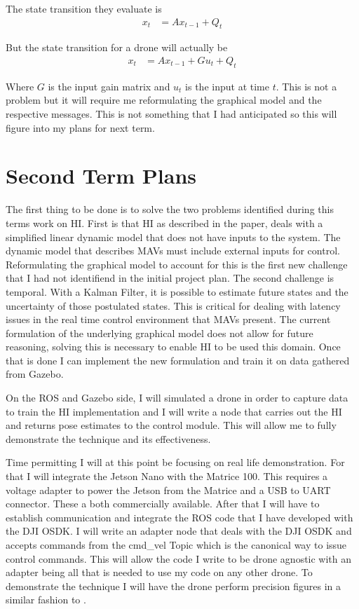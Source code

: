 \documentclass[]{../resources/final_report}
\begin{document}
The state transition they evaluate is 
\begin{align}
  x_t &= Ax_{t-1} + Q_t
\end{align}

But the state transition for a drone will actually be
\begin{align}
  x_t &= Ax_{t-1} + Gu_t + Q_t
\end{align} 

Where $G$ is the input gain matrix and $u_t$ is the input at time $t$.
This is not a problem but it will require me reformulating the graphical model and the respective 
messages. This is not something that I had anticipated so this will figure into my plans for next 
term.

\chapter{Second Term Plans}

The first thing to be done is to solve the two problems identified during this terms work on HI.
First is that HI as described 
in the paper, deals with a simplified linear dynamic model that does not have inputs to the system.
The dynamic model that describes MAVs must include external inputs for control. Reformulating the 
graphical model to account for this is the first new challenge that I had not identifiend in the 
initial project plan. The second challenge is temporal. With a Kalman Filter, it is possible to 
estimate future states and the uncertainty of those postulated states. This is critical for dealing 
with latency issues in the real time control environment that MAVs present. The current formulation 
of the underlying graphical model does not allow for future reasoning, solving this is necessary to
enable HI to be used this domain. Once that is done I can implement the new formulation and train it on data gathered from Gazebo.

On the ROS and Gazebo side, I will simulated a drone in order to capture data to train the HI 
implementation and I will write a node that carries out the HI and returns 
pose estimates to the control module. This will allow me to fully demonstrate the technique and 
its effectiveness.

Time permitting I will at this point be focusing on real life demonstration. For that I will 
integrate the Jetson Nano with the Matrice 100. This requires a voltage adapter to power the 
Jetson from the Matrice and a USB to UART connector. These a both commercially available. 
After that I will have to establish communication and integrate the ROS code that I have developed 
with the DJI OSDK. I will write an adapter node that deals with the DJI OSDK and accepts commands 
from the cmd\_vel Topic which is the canonical way to issue control commands. This will allow the 
code I write to be drone agnostic with an adapter being all that is needed to use my code on any 
other drone. To demonstrate the technique I will have the drone perform precision figures in a 
similar fashion to \cite{Engel:FigureFlying}.
\end{document}
